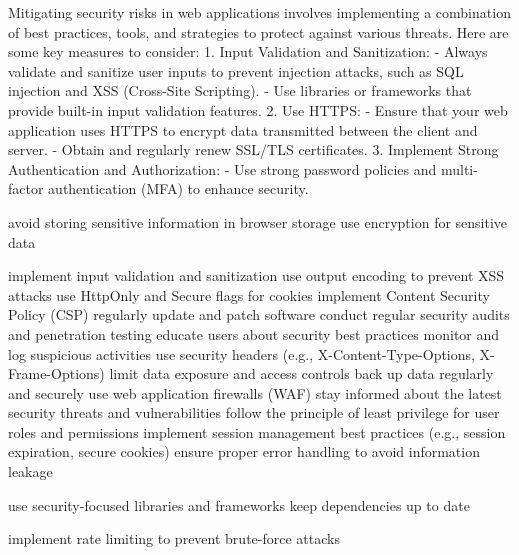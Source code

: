 {Mitigating security risks in web applications involves implementing a combination of best practices, tools, and strategies to protect against various threats. Here are some key measures to consider:  
1. Input Validation and Sanitization:
   - Always validate and sanitize user inputs to prevent injection attacks, such as SQL injection and XSS (Cross-Site Scripting).
   - Use libraries or frameworks that provide built-in input validation features.
2. Use HTTPS:
   - Ensure that your web application uses HTTPS to encrypt data transmitted between the client and server.
   - Obtain and regularly renew SSL/TLS certificates.
3. Implement Strong Authentication and Authorization:
   - Use strong password policies and multi-factor authentication (MFA) to enhance security.                



   avoid storing sensitive information in browser storage
   use encryption for sensitive data

   implement input validation and sanitization
   use output encoding to prevent XSS attacks
   use HttpOnly and Secure flags for cookies
   implement Content Security Policy (CSP)
   regularly update and patch software
   conduct regular security audits and penetration testing
   educate users about security best practices
   monitor and log suspicious activities
   use security headers (e.g., X-Content-Type-Options, X-Frame-Options)
   limit data exposure and access controls
   back up data regularly and securely
   use web application firewalls (WAF)
   stay informed about the latest security threats and vulnerabilities
   follow the principle of least privilege for user roles and permissions
   implement session management best practices (e.g., session expiration, secure cookies)
   ensure proper error handling to avoid information leakage        

    use security-focused libraries and frameworks
    keep dependencies up to date    

    implement rate limiting to prevent brute-force attacks

}
